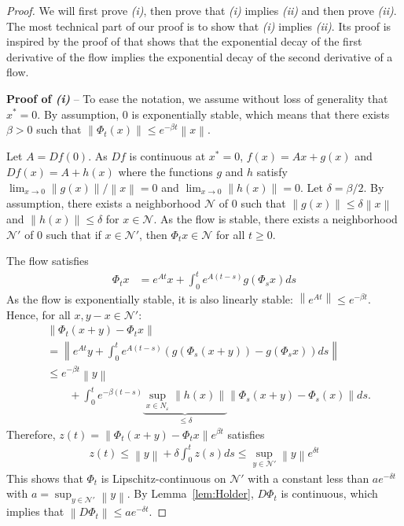\documentclass[sigconf]{acmart}
\newcommand\calN{\mathcal{N}}
\newcommand\norm[1]{\left\|#1\right\|}
\begin{document}
\begin{proof}
  We will first prove \emph{(i)}, then prove that \emph{(i)} implies
  \emph{(ii)} and then prove \emph{(ii)}.  The most technical part of
  our proof is to show that \emph{(i)} implies \emph{(ii)}. Its proof
  is inspired by the proof of \cite[Lemma~C.1]{eldering2013normally}
  that shows that the exponential decay of the first derivative of
  the flow implies the exponential decay of the second derivative of a
  flow.
  
  \textbf{Proof of \emph{(i)}} -- To ease the notation, we assume
  without loss of generality that $x^*=0$. By assumption, $0$ is
  exponentially stable, which means that there exists $\beta>0$ such
  that $\norm{\Phi_t(x)}\le e^{-\beta t}\norm{x}$.

  Let $A=Df(0)$.  As $Df$ is continuous at $x^*=0$, $f(x)=Ax + g(x)$
  and $Df(x)=A+h(x)$ where the functions $g$ and $h$ satisfy
  $\lim_{x\to0}\norm{g(x)}/\norm{x}=0$ and
  $\lim_{x\to0}\norm{h(x)}=0$. Let $\delta=\beta/2$. By assumption,
  there exists a neighborhood $\calN$ of $0$ such that
  $\norm{g(x)}\le\delta\norm{x}$ and $\norm{h(x)}\le\delta$ for
  $x\in\calN$. As the flow is stable, there exists a neighborhood
  $\calN'$ of $0$ such that if $x\in\calN'$, then $\Phi_tx\in \calN$
  for all $t\ge0$.
  
  The flow satisfies
  \begin{align*}
    \Phi_tx &= e^{At}x + \int_0^t e^{A(t-s)} g(\Phi_sx)ds
  \end{align*}
  As the flow is exponentially stable, it is also linearly stable:
  $\norm{e^{At}}\le e^{-\beta t}$. Hence, for all $x,y-x\in\calN'$:
  \begin{align*}
    & \norm{\Phi_t(x+y) - \Phi_tx}\\
    &= \norm{e^{At}y + \int_0^t e^{A(t-s)}
      (g(\Phi_s(x+y))-g(\Phi_sx))ds}\\
    &\le e^{-\beta t}\norm{y} \\
    &\qquad+ \int_0^t
      e^{-\beta(t-s)} \underbrace{\sup_{x\in 
      N_\varepsilon}\norm{h(x)}}_{\le\delta}\norm{\Phi_s(x+y)-\Phi_s(x)}ds. 
  \end{align*}
  Therefore, $z(t)=\norm{\Phi_t(x+y)-\Phi_tx}e^{\beta t}$ satisfies
  \begin{align*}
    z(t)\le \norm{y} + \delta \int_0^t z(s)ds \le
    \sup_{y\in\calN'}\norm{y}e^{\delta t}
  \end{align*}
  This shows that $\Phi_t$ is Lipschitz-continuous on $\calN'$ with a
  constant less than $ae^{-\delta t}$ with
  $a=\sup_{y\in\calN'}\norm{y}$. By Lemma~\ref{lem:Holder}, $D\Phi_t$
  is continuous, which implies that
  $\norm{D\Phi_t}\le ae^{-\delta t}$. 
  

\end{proof}
\end{document}
